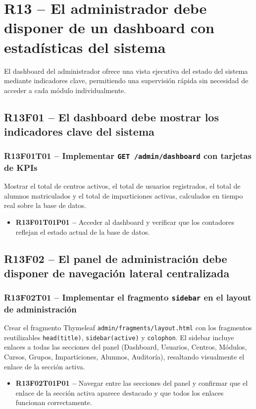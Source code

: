 \documentclass[12pt, a4paper]{report}
\begin{document}
\section{R13 -- El administrador debe disponer de un dashboard con estadísticas del sistema}

El dashboard del administrador ofrece una vista ejecutiva del estado del sistema mediante indicadores clave, permitiendo una supervisión rápida sin necesidad de acceder a cada módulo individualmente.

\subsection{R13F01 -- El dashboard debe mostrar los indicadores clave del sistema}

\subsubsection{R13F01T01 -- Implementar \texttt{GET /admin/dashboard} con tarjetas de KPIs}
Mostrar el total de centros activos, el total de usuarios registrados, el total de alumnos matriculados y el total de imparticiones activas, calculados en tiempo real sobre la base de datos.
\begin{itemize}
  \item \textbf{R13F01T01P01 --} Acceder al dashboard y verificar que los contadores reflejan el estado actual de la base de datos.
\end{itemize}

\subsection{R13F02 -- El panel de administración debe disponer de navegación lateral centralizada}

\subsubsection{R13F02T01 -- Implementar el fragmento \texttt{sidebar} en el layout de administración}
Crear el fragmento Thymeleaf \texttt{admin/fragments/layout.html} con los fragmentos reutilizables \texttt{head(title)}, \texttt{sidebar(active)} y \texttt{colophon}. El sidebar incluye enlaces a todas las secciones del panel (Dashboard, Usuarios, Centros, Módulos, Cursos, Grupos, Imparticiones, Alumnos, Auditoría), resaltando visualmente el enlace de la sección activa.
\begin{itemize}
  \item \textbf{R13F02T01P01 --} Navegar entre las secciones del panel y confirmar que el enlace de la sección activa aparece destacado y que todos los enlaces funcionan correctamente.
\end{itemize}
\end{document}
